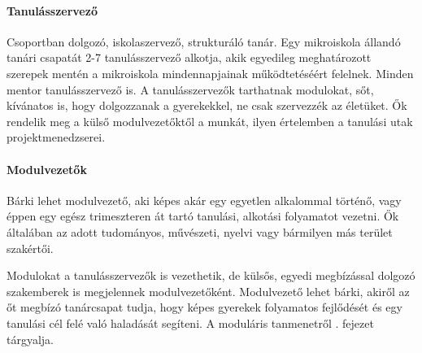   \paragraph{Tanulásszervező}
  Csoportban dolgozó, iskolaszervező, strukturáló tanár. Egy mikroiskola állandó tanári
  csapatát 2-7 tanulásszervező alkotja, akik egyedileg meghatározott szerepek mentén a mikroiskola mindennapjainak működtetéséért felelnek. Minden mentor tanulásszervező is. A tanulásszervezők tarthatnak
  modulokat, sőt, kívánatos is, hogy dolgozzanak a gyerekekkel, ne csak szervezzék az életüket.
  Ők rendelik meg a külső modulvezetőktől a munkát, ilyen értelemben a
  tanulási utak projektmenedzserei.

  \paragraph{Modulvezetők}

  Bárki lehet modulvezető, aki képes akár egy egyetlen alkalommal történő, vagy éppen
  egy egész trimeszteren át tartó tanulási, alkotási folyamatot vezetni. Ők általában
  az adott tudományos, művészeti, nyelvi vagy bármilyen más terület szakértői.

  Modulokat a tanulásszervezők is vezethetik, de külsős, egyedi megbízással dolgozó szakemberek is megjelennek modulvezetőként. Modulvezető lehet bárki, akiről az őt megbízó tanárcsapat tudja, hogy képes gyerekek folyamatos fejlődését és egy tanulási cél felé való haladását segíteni. A moduláris tanmenetről . fejezet tárgyalja.
